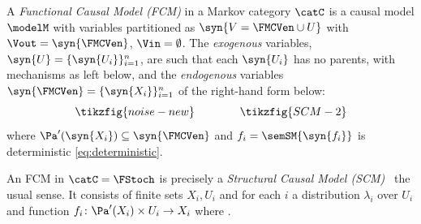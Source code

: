 \documentclass{article}
\begin{document}

\begin{definition} \label{def:FCM}
A \emph{Functional Causal Model (FCM)} in a Markov category $\catC$ is a causal model $\modelM$ with variables partitioned as $\syn{V = \FMCVen \cup U}$ with $\Vout = \syn{\FMCVen}$, $\Vin=\emptyset$. The \emph{exogenous} variables, $\syn{U}=\{\syn{U_i}\}^n_{i=1}$, are such that each $\syn{U_i}$ has no parents, with mechanisms as left below, and the \emph{endogenous} variables  $\syn{\FMCVen} = \{\syn{X_i}\}^n_{i=1}$ of the right-hand form below:
\begin{equation} \label{eq:noise-var}
\tikzfig{noise-new}
\qquad \qquad 
\tikzfig{SCM-2}
\end{equation}
where $\Pa'(\syn{X_i}) \subseteq \syn{\FMCVen}$ and $f_i = \semSM{\syn{f_i}}$ is deterministic \eqref{eq:deterministic}. 
\end{definition}
	

\begin{example}
An FCM in $\catC = \FStoch$ is precisely a \emph{Structural Causal Model (SCM)} \ the usual sense. It consists of finite sets $X_i,U_i$ and for each $i$ a distribution $\lambda_i$ over $U_i$ and function $f_i \colon \Pa'(X_i) \times U_i \to X_i$ where . 
\end{example}
\end{document}
